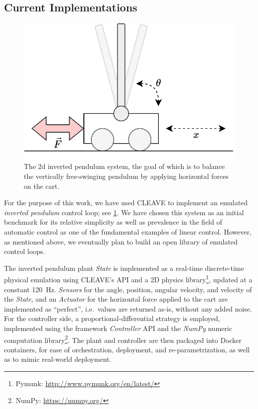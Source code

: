 \subsection{Current Implementations}

\begin{figure}
    \centering
    \includegraphics[width=.7\columnwidth]{images/inverted_pendulum.png}
    \caption{
        The 2d inverted pendulum system, the goal of which is to balance the vertically free-swinging pendulum by applying horizontal forces on the cart.
    }\label{fig:invpend}
\end{figure}

For the purpose of this work, we have used \ac{CLEAVE} to implement an emulated \emph{inverted pendulum} control loop; see \cref{fig:invpend}.
We have chosen this system as an initial benchmark for its relative simplicity as well as prevalence in the field of automatic control as one of the fundamental examples of linear control.
However, as mentioned above, we eventually plan to build an open library of emulated control loops.  

The inverted pendulum plant \emph{State} is implemented as a real-time discrete-time physical emulation using CLEAVE's API and a 2D physics library\footnote{Pymunk: \url{http://www.pymunk.org/en/latest/}}, updated at a constant \SI{120}{\hertz}.
\emph{Sensors} for the angle, position, angular velocity, and velocity of the \emph{State}, and an \emph{Actuator} for the horizontal force applied to the cart are implemented as ``perfect'', i.e.\ values are returned as-is, without any added noise.
For the controller side, a proportional-differential strategy is employed, implemented using the framework \emph{Controller} API and the \emph{NumPy} numeric computation library\footnote{NumPy: \url{https://numpy.org/}}.
The plant and controller are then packaged into Docker containers, for ease of orchestration, deployment, and re-parametrization, as well as to mimic real-world deployment.
